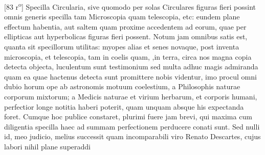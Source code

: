                 \vspace*{8mm}
                \pstart 
                \normalsize
            [83 r\textsuperscript{o}] Specilla Circularia\protect{}, sive quomodo per solas  Circulares figuras fieri possint omnis generis specilla\protect{}  tam Microscopia\protect{} quam telescopia\protect{}, etc: eundem plane  effectum habentia, aut saltem quam proxime accedentem  ad eorum, quae per ellipticas aut hyperbolicas figuras  fieri possent. \pend \pstart  Notum jam omnibus satis est, quanta sit specillorum\protect{}  utilitas: myopes\protect{} alias et senes novaque, post inventa microscopia\protect{}, et telescopia\protect{}, tam in coelis quam, ,\pend \pstart\noindent in terra, circa  nos magna copia detecta objecta, luculentum sunt testimonium  sed multa adhuc magis admiranda quam ea quae hactenus detecta sunt promittere nobis videntur, imo procul omni  dubio horum ope ab astronomis motuum coelestium, a  Philosophis naturae corporum mixtorum; a Medicis  naturae et virium herbarum, et corporis humani, perfectior longe notitia haberi poterit, quam unquam absque his  expectanda foret. Cumque hoc publice constaret, plurimi  fuere jam brevi, qui maxima cum diligentia specilla\protect{}  haec ad summam perfectionem perducere conati sunt. Sed  nulli id, meo judicio, melius successit quam incomparabili  viro Renato Descartes\protect{}, cujus labori nihil plane superaddi 